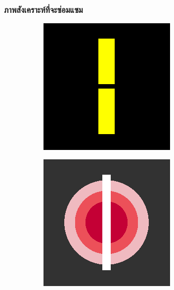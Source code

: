 \documentclass[xcolor=dvipsnames, xetex,serif]{beamer}
\numberwithin{equation}{section}
\begin{document}
    \begin{frame}
        \frametitle{ภาพสังเคราะห์ที่จะซ่อมแซม}
        \begin{figure}[H]
            \centering
            \begin{subfigure}{0.3\linewidth}
                \centering
                \includegraphics[width=0.7\linewidth]{images/image_inpaint_synthetic/case01-toinpaint.png}
            \end{subfigure}
            \begin{subfigure}{0.3\linewidth}
                \centering
                \includegraphics[width=0.7\linewidth]{images/image_inpaint_synthetic/case02-toinpaint.png}
            \end{subfigure}
            \vspace{1cm}
            \begin{subfigure}{0.3\linewidth}

\end{subfigure}
\end{figure}
\end{frame}
\end{document}
